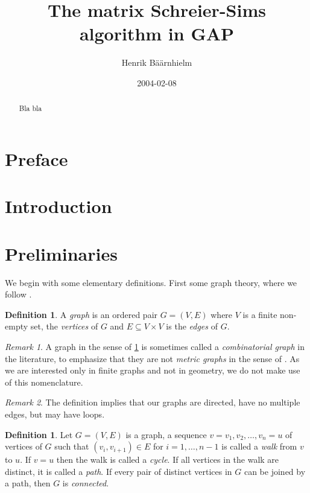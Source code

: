 \documentclass[draft]{amsart}
\title{The matrix Schreier-Sims algorithm in GAP}
\author{Henrik B\"a\"arnhielm}
\date{2004-02-08}
\theoremstyle{plain}
\theoremstyle{definition}
\newtheorem{deff}[theorem]{Definition}
\theoremstyle{remark}
\newtheorem{remark}{Remark}
\begin{document}
\begin{titlepage}
\begin{abstract}
Bla bla
\end{abstract}


\maketitle
\thispagestyle{empty}

\end{titlepage}

\tableofcontents

\newpage

\section{Preface}

\section{Introduction} \label{intro}

\section{Preliminaries}
We begin with some elementary definitions. First some graph theory, where we follow \cite{biggs89}.

\begin{deff} \label{def_graph}
A \emph{graph} is an ordered pair $G = (V, E)$ where $V$ is a finite non-empty set, the \emph{vertices} of $G$ and $E \subseteq V \times V$ is the \emph{edges} of $G$.
\end{deff}
\begin{remark}
  A graph in the sense of \ref{def_graph} is sometimes called a
  \emph{combinatorial graph} in the literature, to emphasize that they
  are not \emph{metric graphs} in the sense of \cite{bridson99}. As we
  are interested only in finite graphs and not in geometry, we do not
  make use of this nomenclature.
\end{remark}

\begin{remark}
The definition implies that our graphs are directed, have no multiple edges, but may have loops.
\end{remark}

\begin{deff} \label{def_graph_misc}
Let $G = (V, E)$ is a graph, a sequence $v = v_1, v_2, \dotsc, v_n =
  u$ of vertices of $G$ such that $(v_i, v_{i + 1}) \in E$ for $i = 1,
  \dotsc, n - 1$ is called a \emph{walk} from $v$ to $u$. If $v = u$
  then the walk is called a \emph{cycle}. If all vertices in the walk are
  distinct, it is called a \emph{path}. If every pair of distinct vertices in $G$ can be joined by a path, then $G$ is \emph{connected}.
\end{deff}
\end{document}
